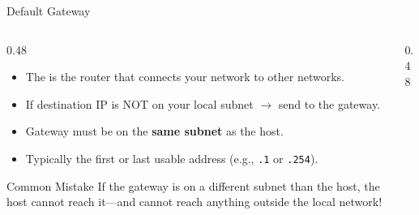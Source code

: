 \documentclass[aspectratio=169]{beamer}  %
\begin{document}
\begin{frame}{Default Gateway}
    \begin{columns}[T]
        \begin{column}{0.48\textwidth}
            \begin{itemize}
                \item The  is the router that connects your network to other networks.
                \item If destination IP is NOT on your local subnet $\rightarrow$ send to the gateway.
                \item Gateway must be on the \textbf{same subnet} as the host.
                \item Typically the first or last usable address (e.g., \texttt{.1} or \texttt{.254}).
            \end{itemize}
            
            \vspace{0.3em}
            \begin{alertblock}{Common Mistake}
                If the gateway is on a different subnet than the host, the host cannot reach it---and cannot reach anything outside the local network!
            \end{alertblock}
        \end{column}
        \begin{column}{0.48\textwidth}
            \begin{center}
\end{center}
\end{column}
\end{columns}
\end{frame}
\end{document}
